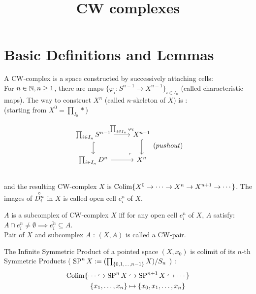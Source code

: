 


    \title{CW complexes}
    \author{{\color{pink}{Cloudi}}{\color{Aquamarine}{fold}}}
    \maketitle
    \newpage

    \setcounter{section}{-1}

    \section{Basic Definitions and Lemmas}
    \begin{defn}
        A CW-complex is a space constructed by successively attaching cells:\\
        For $n \in \mathbb N, n \geq 1$, there are maps $\{ \varphi_i : S^{n-1} \to X^{n-1} \}_{i \in I_n}$
        (called characteristic maps). The way to construct $X^n$ (called $n$-skeleton of $X$) is :\\
        (starting from $X^0 = \prod_{I_0} \ast $)

        \[\begin{tikzcd}
            {\prod_{i \in I_n}S^{n-1}} & {X^{n-1}} \\
            {\prod_{i\in I_n}D^n} & {X^n}
            \arrow[hook, from=1-1, to=2-1]
            \arrow[from=2-1, to=2-2]
            \arrow["{\prod_{i \in I_n}\varphi_i}", from=1-1, to=1-2]
            \arrow[hook, from=1-2, to=2-2]
            \arrow["\lrcorner"{anchor=center, pos=0.125, rotate=180}, draw=none, from=2-2, to=1-1]
        \end{tikzcd}(pushout)\]\\
        and the resulting CW-complex $X$ is $\operatorname{Colim} \{X^0 \to \cdots \to X^n \to X^{n+1} \to \cdots \}$.
        The images of $\overset{\circ}{D^n_i}$ in $X$ is called open cell $e^n_i$ of $X$.
    \end{defn}

    \begin{defn}
        $A$ is a subcomplex of CW-complex $X$ iff for any open cell $e^n_i$ of $X$, $A$ satisfy:
        $A \cap e^n_i \neq \emptyset \implies \bar{e^n_i} \subseteq A $.\\
        Pair of $X$ and subcomplex $A$ : $(X,A)$ is called a CW-pair.
    \end{defn}

    \begin{defn}
        The Infinite Symmetric Product of a pointed space $(X,x_0)$ is colimit of its $n$-th Symmetric Products
        ( $\operatorname{SP}^n X := (\prod_{\{0,1,\dots , n-1\}} X ) / S_n$ ) :\\
        \begin{align*}
            \operatorname{Colim} \{\dots \hookrightarrow \operatorname{SP}^{n} X & \hookrightarrow \operatorname{SP}^{n+1} X \hookrightarrow \cdots \} \\
            \{x_1, \dots, x_n\} & \mapsto \{x_0, x_1, \dots, x_n\}    
        \end{align*}
    \end{defn}

